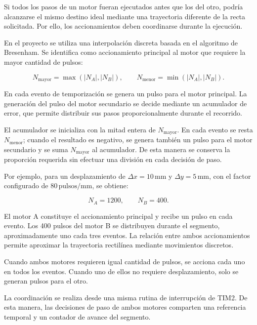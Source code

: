 \documentclass[blue,fullpaper]{ludusofficial}  %
\begin{document}
Si todos los pasos de un motor fueran ejecutados
antes que los del otro, podría alcanzarse el mismo
destino ideal mediante una trayectoria diferente
de la recta solicitada. Por ello, los accionamientos
deben coordinarse durante la ejecución.

En el proyecto se utiliza una interpolación discreta
basada en el algoritmo de Bresenham. Se identifica
como accionamiento principal al motor que requiere
la mayor cantidad de pulsos:

\begin{equation}
    N_{\mathrm{mayor}} = \max(|N_A|,|N_B|),
    \qquad
    N_{\mathrm{menor}} = \min(|N_A|,|N_B|).
\end{equation}

En cada evento de temporización se genera un pulso
para el motor principal. La generación del pulso
del motor secundario se decide mediante un acumulador
de error, que permite distribuir sus pasos
proporcionalmente durante el recorrido.

El acumulador se inicializa con la mitad entera
de $N_{\mathrm{mayor}}$. En cada evento se resta
$N_{\mathrm{menor}}$; cuando el resultado es negativo,
se genera también un pulso para el motor secundario
y se suma $N_{\mathrm{mayor}}$ al acumulador.
De esta manera se conserva la proporción requerida
sin efectuar una división en cada decisión de paso.

Por ejemplo, para un desplazamiento de
$\Delta x = 10\,\mathrm{mm}$ y
$\Delta y = 5\,\mathrm{mm}$, con el factor
configurado de $80\,\mathrm{pulsos/mm}$, se obtiene:

\begin{equation}
    N_A = 1200,
    \qquad
    N_B = 400.
\end{equation}

El motor A constituye el accionamiento principal
y recibe un pulso en cada evento. Los 400 pulsos
del motor B se distribuyen durante el segmento,
aproximadamente uno cada tres eventos.
La relación entre ambos accionamientos permite
aproximar la trayectoria rectilínea mediante
movimientos discretos.

Cuando ambos motores requieren igual cantidad
de pulsos, se acciona cada uno en todos los eventos.
Cuando uno de ellos no requiere desplazamiento,
solo se generan pulsos para el otro.

La coordinación se realiza desde una misma rutina
de interrupción de TIM2. De esta manera,
las decisiones de paso de ambos motores comparten
una referencia temporal y un contador de avance
del segmento.
\end{document}
